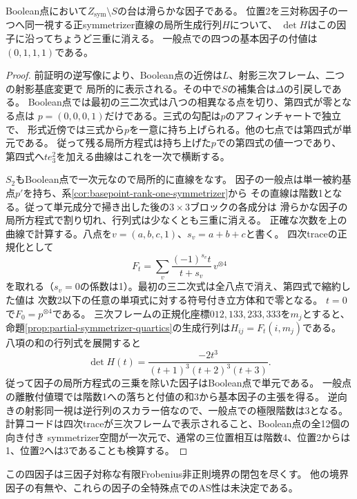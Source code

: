 \begin{proposition}[境界の横断座標と行列式の重複度]\label{prop:boolean-transverse-order}
Boolean点において$Z_{\mathrm{sym}}\setminus S$の台は滑らかな因子である。
位置2を三対称因子の一つへ同一視する正symmetrizer直線の局所生成行列$H$について、
$\det H$はこの因子に沿ってちょうど三重に消える。
一般点での四つの基本因子の付値は$(0,1,1,1)$である。
\end{proposition}
\begin{proof}
前証明の逆写像により、Boolean点の近傍は$L$、射影三次フレーム、二つの射影基底変更で
局所的に表示される。その中で$S$の補集合は$\Delta$の引戻しである。
Boolean点では最初の三二次式は八つの相異なる点を切り、第四式が零となる点は
$p=(0,0,0,1)$だけである。三式の勾配は$p$のアフィンチャートで独立で、
形式近傍では三式から$p$を一意に持ち上げられる。他の七点では第四式が単元である。
従って残る局所方程式は持ち上げた$p$での第四式の値一つであり、
第四式へ$t e_3^2$を加える曲線はこれを一次で横断する。

$S_2$もBoolean点で一次元なので局所的に直線をなす。
因子の一般点は単一被約基点$p'$を持ち、系\ref{cor:basepoint-rank-one-symmetrizer}から
その直線は階数1となる。従って単元成分で掃き出した後の$3\times3$ブロックの各成分は
滑らかな因子の局所方程式で割り切れ、行列式は少なくとも三重に消える。
正確な次数を上の曲線で計算する。八点を$v=(a,b,c,1)$、$s_v=a+b+c$と書く。
四次traceの正規化として
\[
 F_t=\sum_{v}\frac{(-1)^{s_v}t}{t+s_v}\,v^{\otimes4}
\]
を取れる（$s_v=0$の係数は1）。最初の三二次式は全八点で消え、第四式で縮約した値は
次数2以下の任意の単項式に対する符号付き立方体和で零となる。
$t=0$で$F_0=p^{\otimes4}$である。
三次フレームの正規化座標$012,133,233,333$を$m_j$とすると、
命題\ref{prop:partial-symmetrizer-quartics}の生成行列は$H_{ij}=F_t(i,m_j)$である。
八項の和の行列式を展開すると
\[
 \det H(t)=\frac{-2t^3}{(t+1)^3(t+2)^3(t+3)} .
\]
従って因子の局所方程式の三乗を除いた因子はBoolean点で単元である。
一般点の離散付値環では階数1への落ちと付値の和3から基本因子の主張を得る。
逆向きの射影同一視は逆行列のスカラー倍なので、一般点での極限階数は3となる。
計算コードは四次traceが三次フレームで表示されること、Boolean点の全12個の向き付き
symmetrizer空間が一次元で、通常の三位置相互は階数4、位置2からは1、位置2へは3であることも検算する。
\end{proof}

この四因子は三因子対称な有限Frobenius非正則境界の閉包を尽くす。
他の境界因子の有無や、これらの因子の全特殊点でのAS性は未決定である。
